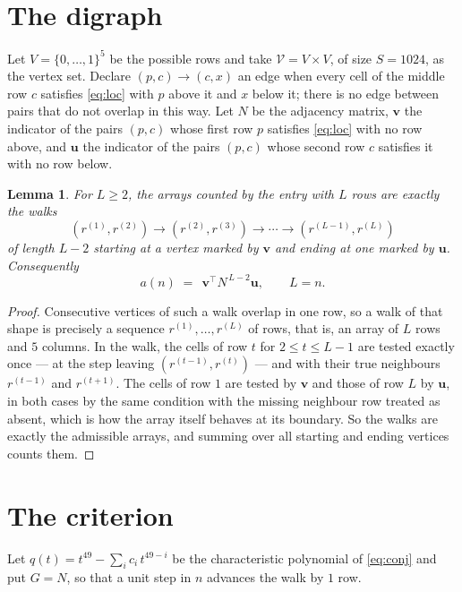 \documentclass[11pt,a4paper]{article}
\theoremstyle{plain}
\newtheorem{lemma}[theorem]{Lemma}
\theoremstyle{definition}
\begin{document}
\section{The digraph}

Let $V=\{0,\dots,1\}^{5}$ be the possible rows and take
$\mathcal V=V\times V$, of size $S=1024$, as the vertex set. Declare $(p,c)\to(c,x)$ an edge
when every cell of the middle row $c$ satisfies \eqref{eq:loc} with $p$ above it and $x$
below it; there is no edge between pairs that do not overlap in this way. Let $N$ be the
adjacency matrix, $\mathbf{v}$ the indicator of the pairs $(p,c)$ whose first row $p$
satisfies \eqref{eq:loc} with no row above, and $\mathbf{u}$ the indicator of
the pairs $(p,c)$ whose second row $c$ satisfies it with no row below.

\begin{lemma}\label{lem:walk}
For $L\ge2$, the arrays counted by the entry with $L$ rows are exactly the walks
\[
(r^{(1)},r^{(2)})\to(r^{(2)},r^{(3)})\to\cdots\to(r^{(L-1)},r^{(L)})
\]
of length $L-2$ starting at a vertex marked by $\mathbf{v}$ and ending at one marked by
$\mathbf{u}$. Consequently
\[
a(n)\;=\;\,\mathbf{v}^{\!\top}N^{\,L-2}\mathbf{u},\qquad L=n .
\]
\end{lemma}

\begin{proof}
Consecutive vertices of such a walk overlap in one row, so a walk of that shape is
precisely a sequence $r^{(1)},\dots,r^{(L)}$ of rows, that is, an array of $L$ rows
and $5$ columns. In the walk, the cells of row $t$ for $2\le t\le L-1$ are tested
exactly once --- at the step leaving $(r^{(t-1)},r^{(t)})$ --- and with their true
neighbours $r^{(t-1)}$ and $r^{(t+1)}$. The cells of row $1$ are tested by
$\mathbf{v}$ and those of row $L$ by $\mathbf{u}$, in both cases by the same condition
with the missing neighbour row treated as absent, which is how the array itself behaves at
its boundary. So the walks are exactly the admissible arrays, and summing over all starting
and ending vertices counts them.
\end{proof}

\section{The criterion}

Let $q(t)=t^{49}-\sum_i c_i\,t^{49-i}$ be the characteristic polynomial of
\eqref{eq:conj} and put $G=N$, so that a unit step in $n$ advances the walk by
$1$ row.
\end{document}

